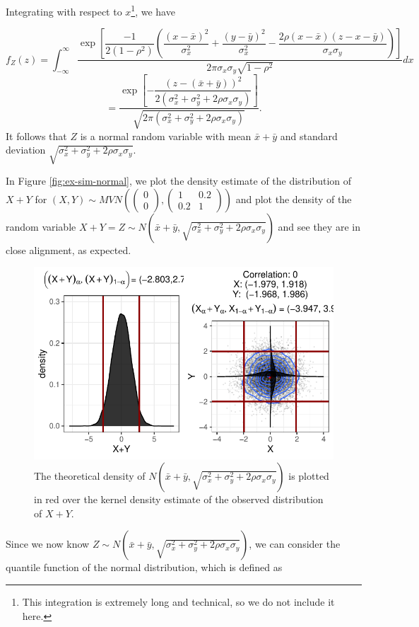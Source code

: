 \documentclass[12pt,twoside]{smiththesis}
\begin{document}
Integrating with respect to \(x\)\footnote{This integration is extremely long and technical, so we do not include it here.}, we have

\[f_Z(z)  = \int_{-\infty}^\infty \dfrac{\exp\left[\dfrac{-1}{2(1-\rho^2)} \left( \dfrac{(x-\bar x)^2}{\sigma_x^2}+\dfrac{(y-\bar y)^2}{\sigma_x^2} - \dfrac{2 \rho (x-\bar x)(z-x-\bar y)}{\sigma_x\sigma_y} \right)\right]}{2\pi \sigma_x \sigma_y \sqrt{1- \rho^2}} dx \]
\[=\dfrac{\exp\left[-\dfrac{(z-(\bar x + \bar y ))^2}{2(\sigma^2_x+\sigma^2_y + 2\rho \sigma_x \sigma_y)}\right]}{\sqrt{2\pi(\sigma_x^2 + \sigma_y^2 + 2\rho \sigma_x \sigma_y)}}.\]
It follows that \(Z\) is a normal random variable with mean \(\bar x + \bar y\) and standard deviation \(\sqrt{\sigma_x^2 +\sigma_y^2 + 2 \rho \sigma_x \sigma_y }\).

In Figure \ref{fig:ex-sim-normal}, we plot the density estimate of the distribution of \(X+Y\) for \((X,Y) \sim MVN\left( \begin{pmatrix} 0\\0 \end{pmatrix}, \begin{pmatrix} 1 & 0.2 \\0.2 & 1 \end{pmatrix}\right)\) and plot the density of the random variable \(X+Y = Z \sim N\left(\bar x + \bar y,\sqrt{\sigma_x^2 +\sigma_y^2 + 2 \rho \sigma_x \sigma_y }\right)\) and see they are in close alignment, as expected.
\begin{figure}

{\centering \includegraphics[width=1\linewidth]{thesis_files/figure-latex/unnamed-chunk-90-1} 

}

\caption{\label{fig:ex-sim-normal} The theoretical density of $N\left(\bar x + \bar y,\sqrt{\sigma_x^2 +\sigma_y^2 + 2 \rho \sigma_x \sigma_y }\right)$ is plotted in red over the kernel density estimate of the observed distribution of $X+Y$.}\label{fig:unnamed-chunk-90}
\end{figure}
Since we now know \(Z \sim N\left(\bar x + \bar y,\sqrt{\sigma_x^2 +\sigma_y^2 + 2 \rho \sigma_x \sigma_y }\right)\), we can consider the quantile function of the normal distribution, which is defined as
\end{document}
